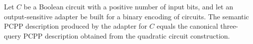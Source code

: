 \begin{theorem}
\label{FABL.QuadraticCircuitOutputSensitiveAdapter.semantic_eq_canonical}
\leanok
{}
Let $C$ be a Boolean circuit with a positive number of input bits, and let an
output-sensitive adapter be built for a binary encoding of circuits. The semantic PCPP
description produced by the adapter for $C$ equals the canonical three-query PCPP
description obtained from the quadratic circuit construction.
\end{theorem}
